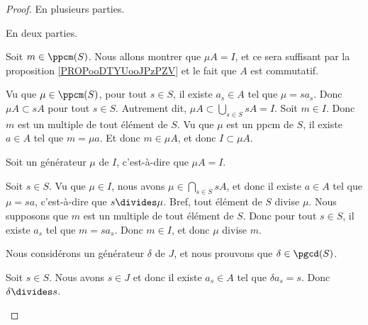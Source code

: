 \begin{proof}
	En plusieurs parties.
	\begin{subproof}
		En deux parties.
		\begin{subproof}
			\spitem[\( \Rightarrow\)]
			Soit \( m\in \ppcm(S)\). Nous allons montrer que \( \mu A=I\), et ce sera suffisant par la proposition \ref{PROPooDTYUooJPzPZV} et le fait que \( A\) est commutatif.
			\begin{subproof}
				\spitem[\( \mu A\subset I\)]
				Vu que \( \mu\in \ppcm(S)\), pour tout \( s\in S\), il existe \( a_s\in A\) tel que \( \mu=s a_s\). Donc \( \mu A\subset sA\) pour tout \( s\in S\). Autrement dit, \( \mu A\subset \bigcup_{s\in S}sA=I\).
				\spitem[\( I\subset \mu A\)]
				Soit \( m\in I\). Donc \( m\) est un multiple de tout élément de \( S\). Vu que \( \mu\) est un ppcm de \( S\), il existe \( a\in A\) tel que \( m=\mu a\). Et donc \( m\in \mu A\), et donc \( I\subset \mu A\).
			\end{subproof}
			\spitem[\( \Leftarrow\)]
			Soit un générateur \( \mu\) de \( I\), c'est-à-dire que \( \mu A=I\).
			\begin{subproof}
				\spitem[\( S\divides \mu\).]
				Soit \( s\in S\). Vu que \( \mu\in I\), nous avons \( \mu\in\bigcap_{s\in S}sA\), et donc il existe \( a\in A\) tel que \( \mu =sa\), c'est-à-dire que \( s\divides \mu\). Bref, tout élément de \( S\) divise \( \mu\).
				\spitem[Si \( S\divides m\), alors \( \mu\divides m\)]
				Nous supposons que \( m\)  est un multiple de tout élément de \( S\). Donc pour tout \( s\in S\), il existe \( a_s\) tel que \( m=sa_s\). Donc \( m\in I\), et donc \( \mu\) divise \( m\).
			\end{subproof}
		\end{subproof}
		\spitem[Pour \ref{ITEMooZUCVooRIpnhU}]
		Nous considérons un générateur \( \delta\) de \( J\), et nous prouvons que \( \delta\in\pgcd(S)\).
		\begin{subproof}
			\spitem[\( \delta\) divise \( S\)]
			Soit \( s\in S\). Nous avons \( s\in J\) et donc il existe \( a_s\in A\) tel que \( \delta a_s=s\). Donc \( \delta\divides s\).


\end{subproof}
\end{subproof}
\end{proof}
